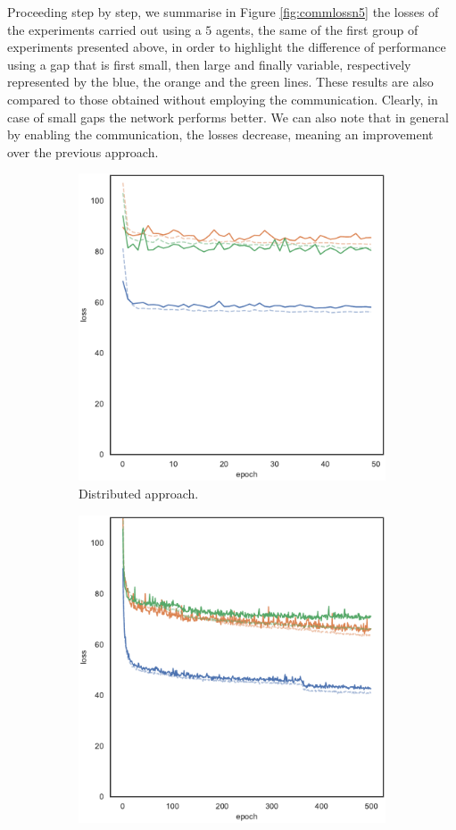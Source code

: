 Proceeding step by step, we summarise in Figure \ref{fig:commlossn5} the losses 
of the experiments carried out using a $5$ agents, the same of the first group of 
experiments presented above, in order to highlight the difference of performance 
using a gap that is first small, then large and finally variable, respectively 
represented by the blue, the orange and the green lines.
These results are also compared to those obtained without employing the 
communication.
Clearly, in case of small gaps the network performs better. We can also note that 
in general by enabling the communication, the losses decrease, meaning an 
improvement over the previous approach.
\begin{figure}[!htb]
	\begin{center}
		\begin{subfigure}[h]{0.49\textwidth}
			\centering
			\includegraphics[width=.7\textwidth]{contents/images/task1-comm-extension/loss-distributed-N5@copy}
			\caption{Distributed approach.}
		\end{subfigure}
		\hfill
		\begin{subfigure}[h]{0.49\textwidth}
			\centering
			\includegraphics[width=.7\textwidth]{contents/images/task1-comm-extension/loss-communication-N5@copy}

\end{subfigure}
\end{center}
\end{figure}
